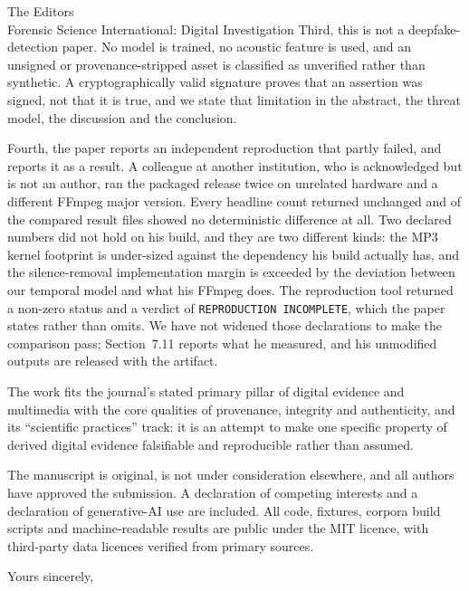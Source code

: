 \documentclass[11pt]{letter}
\begin{document}
\begin{letter}{The Editors\\Forensic Science International: Digital Investigation}
Third, this is not a deepfake-detection paper. No model is trained, no acoustic
feature is used, and an unsigned or provenance-stripped asset is classified as
unverified rather than synthetic. A cryptographically valid signature proves
that an assertion was signed, not that it is true, and we state that limitation
in the abstract, the threat model, the discussion and the conclusion.

Fourth, the paper reports an independent reproduction that partly failed, and
reports it as a result. A colleague at another institution, who is acknowledged
but is not an author, ran the packaged release twice on unrelated hardware and a
different FFmpeg major version. Every headline count returned unchanged and
\IRclean{} of the \IRfiles{} compared result files showed no deterministic
difference at all. Two declared numbers did not hold on his build, and they are
two different kinds: the MP3 kernel footprint is under-sized against the
dependency his build actually has, and the silence-removal implementation margin
is exceeded by the deviation between our temporal model and what his FFmpeg
does. The reproduction tool returned a non-zero status and a verdict of
\texttt{REPRODUCTION INCOMPLETE}, which the paper states rather than omits. We have not widened those declarations to make the
comparison pass; Section~7.11 reports what he measured, and his unmodified
outputs are released with the artifact.

The work fits the journal's stated primary pillar of digital evidence and
multimedia with the core qualities of provenance, integrity and authenticity,
and its ``scientific practices'' track: it is an attempt to make one specific
property of derived digital evidence falsifiable and reproducible rather than
assumed.

The manuscript is original, is not under consideration elsewhere, and all
authors have approved the submission. A declaration of competing interests and a
declaration of generative-AI use are included. All code, fixtures, corpora
build scripts and machine-readable results are public under the MIT licence,
with third-party data licences verified from primary sources.

\closing{Yours sincerely,}
\end{letter}
\end{document}
